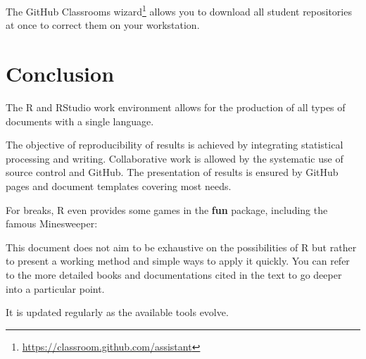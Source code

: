\documentclass[
  12pt,
  american,
  a4paper,
  extrafontsizes,onecolumn,openright
  ]{memoir}
\newenvironment{Shaded}{\begin{snugshade}}{\end{snugshade}}
\newcommand{\AttributeTok}[1]{\textcolor[rgb]{0.77,0.63,0.00}{#1}}
\newcommand{\CommentTok}[1]{\textcolor[rgb]{0.56,0.35,0.01}{\textit{#1}}}
\newcommand{\ControlFlowTok}[1]{\textcolor[rgb]{0.13,0.29,0.53}{\textbf{#1}}}
\newcommand{\FunctionTok}[1]{\textcolor[rgb]{0.00,0.00,0.00}{#1}}
\newcommand{\NormalTok}[1]{#1}
\newcommand{\SpecialCharTok}[1]{\textcolor[rgb]{0.00,0.00,0.00}{#1}}
\newcommand{\StringTok}[1]{\textcolor[rgb]{0.31,0.60,0.02}{#1}}
\begin{document}
The GitHub Classrooms wizard\footnote{\url{https://classroom.github.com/assistant}} allows you to download all student repositories at once to correct them on your workstation.

\hypertarget{chap-conclusion}{%
\chapter{Conclusion}\label{chap-conclusion}}

The R and RStudio work environment allows for the production of all types of documents with a single language.

The objective of reproducibility of results is achieved by integrating statistical processing and writing.
Collaborative work is allowed by the systematic use of source control and GitHub.
The presentation of results is ensured by GitHub pages and document templates covering most needs.

For breaks, R even provides some games in the \textbf{fun} package, including the famous Minesweeper:

\scriptsize

\begin{Shaded}
\end{Shaded}

\normalsize

This document does not aim to be exhaustive on the possibilities of R but rather to present a working method and simple ways to apply it quickly.
You can refer to the more detailed books and documentations cited in the text to go deeper into a particular point.

It is updated regularly as the available tools evolve.


\end{document}
